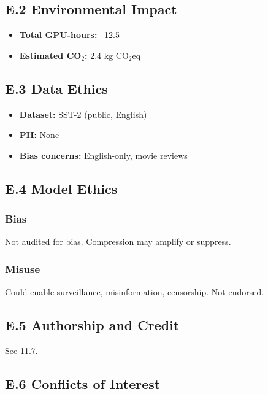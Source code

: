 \subsection{E.2 Environmental Impact}

\begin{itemize}
\item \textbf{Total GPU-hours:} ~12.5
\item \textbf{Estimated CO$_2$:} 2.4 kg CO$_2$eq

\end{itemize}
\subsection{E.3 Data Ethics}

\begin{itemize}
\item \textbf{Dataset:} SST-2 (public, English)
\item \textbf{PII:} None
\item \textbf{Bias concerns:} English-only, movie reviews

\end{itemize}
\subsection{E.4 Model Ethics}

\subsubsection{Bias}

Not audited for bias. Compression may amplify or suppress.

\subsubsection{Misuse}

Could enable surveillance, misinformation, censorship. Not endorsed.

\subsection{E.5 Authorship and Credit}

See  11.7.

\subsection{E.6 Conflicts of Interest}

